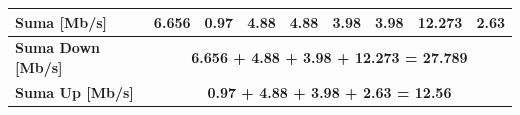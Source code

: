 \documentclass{article}
\begin{document}
\begin{table}[H]
\begin{tabular}{|l|c|c|c|c|c|c|c|c|}
	\textbf{Suma {[}Mb/s{]}}                                                                          & 6.656            & 0.97           & 4.88              & 4.88              & 3.98        & 3.98        & 12.273          & 2.63          \\ \hline
	\textbf{Suma Down {[}Mb/s{]}}                                                                     & \multicolumn{8}{c|}{\textbf{6.656 + 4.88 + 3.98 + 12.273 = 27.789}}                                                                     \\ \hline
	\textbf{Suma Up {[}Mb/s{]}}                                                                       & \multicolumn{8}{c|}{\textbf{0.97 + 4.88 + 3.98 + 2.63 = 12.56}}                                                                         \\ \hline
\end{tabular}
\end{table}
\end{document}
